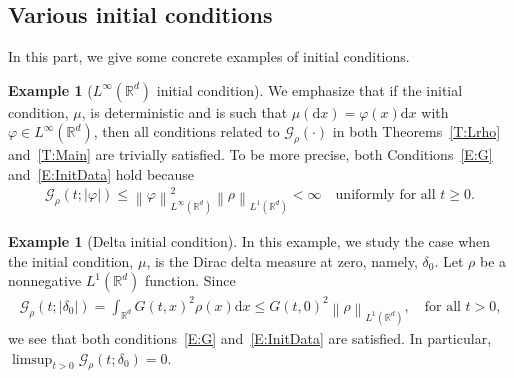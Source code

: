 \documentclass[a4paper,11pt]{article}%
\theoremstyle{plain}
\theoremstyle{definition}
\newtheorem{example}[theorem]{Example}
\numberwithin{equation}{section}
\newcommand{\R}{\mathbb{R}}
\newcommand{\Norm}[1]{\left\| #1 \right\|}
\newcommand{\ud}{\ensuremath{\mathrm{d}}}
\begin{document}
\subsection{Various initial conditions}\label{SS:Init}

In this part, we give some concrete examples of initial conditions.

\begin{example}[$L^\infty(\R^d)$ initial condition]\label{Ex:BddInit}
  We emphasize that if the initial condition, $\mu$, is deterministic and is such that $\mu(\ud x) =
  \varphi(x)\ud x$ with $\varphi\in L^\infty(\R^d)$, then all conditions related to
  $\mathcal{G}_\rho(\cdot)$ in both Theorems~\ref{T:Lrho} and~\ref{T:Main} are trivially satisfied.
  To be more precise, both Conditions~\eqref{E:G} and~\eqref{E:InitData} hold because
  \begin{align*}
    \mathcal{G}_\rho(t;|\varphi|) \le \Norm{\varphi}_{L^\infty(\R^d)}^2 \Norm{\rho}_{L^1 (\R^d)}< \infty
    \quad \text{uniformly for all $t\ge 0$.}
  \end{align*}
\end{example}

\begin{example}[Delta initial condition]\label{Ex:delta}
  In this example, we study the case when the initial condition, $\mu$, is the Dirac delta measure
  at zero, namely, $\delta_0$. Let $\rho$ be a nonnegative $L^1 (\R^d)$ function. Since
  \begin{align*}
    \mathcal{G}_\rho(t;|\delta_0|)
    = \int_{\R^d} G(t,x)^2 \rho(x) \ud x
    \le G(t,0)^2 \Norm{\rho}_{L^1 (\R^d)},
    \quad \text{for all $t>0$,}
  \end{align*}
  we see that both conditions~\eqref{E:G} and~\eqref{E:InitData} are satisfied. In particular,
  $\limsup_{t>0} \mathcal{G}_\rho(t;\delta_0) = 0$.
\end{example}
\end{document}

